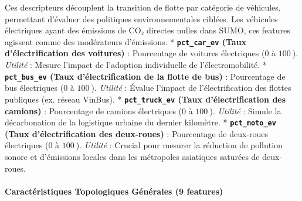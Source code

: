 \documentclass[10pt, a4paper]{article}
\begin{document}
Ces descripteurs découplent la transition de flotte par catégorie de
véhicules, permettant d'évaluer des politiques environnementales
ciblées. Les véhicules électriques ayant des émissions de CO₂ directes
nulles dans SUMO, ces features agissent comme des modérateurs
d'émissions. * \textbf{\texttt{pct\_car\_ev} (Taux d'électrification des
voitures)} : Pourcentage de voitures électriques (\(0\) à \(100\ %
\)). \emph{Utilité} : Mesure l'impact de l'adoption individuelle de
l'électromobilité. * \textbf{\texttt{pct\_bus\_ev} (Taux
d'électrification de la flotte de bus)} : Pourcentage de bus électriques
(\(0\) à \(100\ %
\)). \emph{Utilité} : Évalue l'impact de l'électrification des flottes
publiques (ex. réseau VinBus). * \textbf{\texttt{pct\_truck\_ev} (Taux
d'électrification des camions)} : Pourcentage de camions électriques
(\(0\) à \(100\ %
\)). \emph{Utilité} : Simule la décarbonation de la logistique urbaine
du dernier kilomètre. * \textbf{\texttt{pct\_moto\_ev} (Taux
d'électrification des deux-roues)} : Pourcentage de deux-roues
électriques (\(0\) à \(100\ %
\)). \emph{Utilité} : Crucial pour mesurer la réduction de pollution
sonore et d'émissions locales dans les métropoles asiatiques saturées de
deux-roues.

\paragraph{Caractéristiques Topologiques Générales (9
features)}\label{caractuxe9ristiques-topologiques-guxe9nuxe9rales-9-features}
\end{document}
